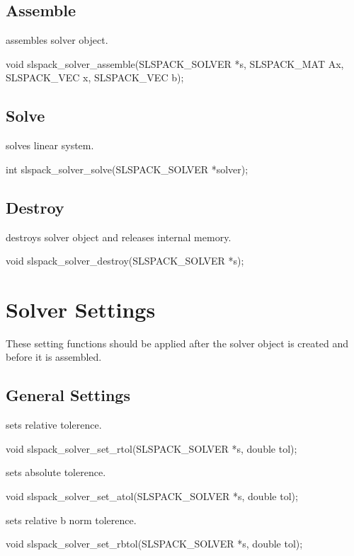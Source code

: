 \subsection{Assemble}
 assembles solver object.
\begin{evb}
void slspack_solver_assemble(SLSPACK_SOLVER *s, SLSPACK_MAT Ax, SLSPACK_VEC x,
    SLSPACK_VEC b);
\end{evb}

\subsection{Solve}
 solves linear system.
\begin{evb}
int slspack_solver_solve(SLSPACK_SOLVER *solver);
\end{evb}

\subsection{Destroy}
 destroys solver object and releases internal
memory.
\begin{evb}
void slspack_solver_destroy(SLSPACK_SOLVER *s);
\end{evb}

\section{Solver Settings}

These setting functions should be applied after the solver object is created and before
it is assembled.

\subsection{General Settings}

 sets relative tolerence.
\begin{evb}
void slspack_solver_set_rtol(SLSPACK_SOLVER *s, double tol);
\end{evb}

 sets absolute tolerence.
\begin{evb}
void slspack_solver_set_atol(SLSPACK_SOLVER *s, double tol);
\end{evb}

 sets relative b norm tolerence.
\begin{evb}
void slspack_solver_set_rbtol(SLSPACK_SOLVER *s, double tol);
\end{evb}

